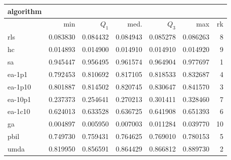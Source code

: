 \begin{tabular}{@{}l*{5}{>{{}}N{1}{3}}>{{}}N{2}{0}@{}}
\toprule
{algorithm} &  \\
\midrule
& {min} & {$Q_1$} & {med.} & {$Q_3$} & {max} & {rk}\\
\midrule
rls & 0.083830 & 0.084432 & 0.084943 & 0.085278 & 0.086263 & 8\\
hc & 0.014893 & 0.014900 & 0.014910 & 0.014910 & 0.014920 & 9\\
sa & {\color{blue}} 0.945447 & {\color{blue}} 0.956495 & {\color{blue}} 0.961574 & {\color{blue}} 0.964904 & {\color{blue}} 0.977697 & 1\\
ea-1p1 & 0.792453 & 0.810692 & 0.817105 & 0.818533 & 0.832687 & 4\\
ea-1p10 & 0.801887 & 0.814502 & 0.820745 & 0.830647 & 0.841570 & 3\\
ea-10p1 & 0.237373 & 0.254641 & 0.270213 & 0.301411 & 0.328460 & 7\\
ea-1c10 & 0.624013 & 0.633528 & 0.636725 & 0.641908 & 0.651393 & 6\\
ga & 0.004897 & 0.005950 & 0.007003 & 0.011284 & 0.039770 & 10\\
pbil & 0.749730 & 0.759431 & 0.764625 & 0.769010 & 0.780153 & 5\\
umda & 0.819950 & 0.856591 & 0.864429 & 0.866812 & 0.889730 & 2\\
\bottomrule
\end{tabular}
